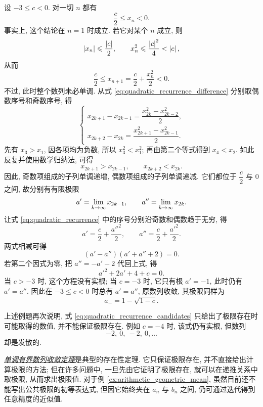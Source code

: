 \label{case:quadratic_recurrence_negative}
设 $-3\leqslant c<0$. 对一切 $n$ 都有
$$
\frac c2\leqslant x_n<0.
$$
事实上, 这个结论在 $n=1$ 时成立. 若它对某个 $n$ 成立, 则
$$
\left| x_n \right|\leqslant\frac{\left| c \right|}{2},\qquad
x_n^2\leqslant\frac{\left| c \right|^2}{4}<\left| c \right|,
$$
从而
$$
\frac c2\leqslant x_{n+1}=\frac c2+\frac{x_n^2}{2}<0.
$$
不过, 此时整个数列未必单调. 从式
\eqref{eq:quadratic_recurrence_difference} 分别取偶数序号和奇数序号, 得
\begin{equation}\label{eq:quadratic_recurrence_subsequence_differences}
\begin{cases}
x_{2k+1}-x_{2k-1}=\dfrac{x_{2k}^2-x_{2k-2}^2}{2},\\[2mm]
x_{2k+2}-x_{2k}=\dfrac{x_{2k+1}^2-x_{2k-1}^2}{2}.
\end{cases}
\end{equation}
先有 $x_3>x_1$, 因各项均为负数, 所以 $x_3^2<x_1^2$;
再由第二个等式得到 $x_4<x_2$. 如此反复并使用数学归纳法, 可得
$$
x_{2k+1}>x_{2k-1},\qquad x_{2k+2}<x_{2k}.
$$
因此, 奇数项组成的子列单调递增, 偶数项组成的子列单调递减.
它们都位于 $\dfrac c2$ 与 $0$ 之间, 故分别有有限极限
$$
a'=\lim\limits_{k \to \infty}x_{2k-1},\qquad a''=\lim\limits_{k \to \infty}x_{2k}.
$$
让式 \eqref{eq:quadratic_recurrence} 中的序号分别沿奇数和偶数趋于无穷, 得
$$
a'=\frac c2+\frac{a''^2}{2},\qquad
a''=\frac c2+\frac{a'^2}{2}.
$$
两式相减可得
\begin{equation}\label{eq:quadratic_recurrence_subsequence_limits}
(a'-a'')(a'+a''+2)=0.
\end{equation}
若第二个因式为零, 把 $a''=-a'-2$ 代回上式, 得
$$
a'^2+2a'+4+c=0.
$$
当 $c>-3$ 时, 这个方程没有实根; 当 $c=-3$ 时, 它只有根 $a'=-1$,
此时仍有 $a'=a''$. 因此在 $-3\leqslant c<0$ 时总有 $a'=a''$,
原数列收敛, 其极限同样为
$$
a_-=1-\sqrt{1-c}.
$$

上述例题再次说明, 式 \eqref{eq:quadratic_recurrence_candidates}
只给出了极限存在时可能取得的数值, 并不能保证极限存在.
例如 $c=-4$ 时, 该式仍有实根, 但数列
$$
-2,\ 0,\ -2,\ 0,\ldots
$$
却是发散的.

\begin{remark}
\hyperref[thm:monotone_convergence]{\emph{单调有界数列收敛定理}}是典型的存在性定理.
它只保证极限存在, 并不直接给出计算极限的方法; 但在许多问题中,
一旦先由它证明了极限存在, 就可以在递推关系中取极限, 从而求出极限值.
对于例 \ref{ex:arithmetic_geometric_mean}, 虽然目前还不能写出公共极限的初等表达式,
但因它始终夹在 $a_n$ 与 $b_n$ 之间, 仍可通过迭代得到任意精度的近似值.
\end{remark}

